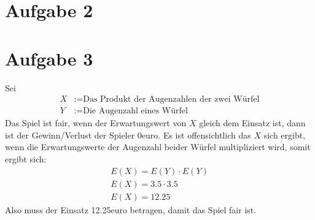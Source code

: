 \documentclass[a4paper,10pt]{article}
\begin{document}
\section*{Aufgabe 2}
\section*{Aufgabe 3}
Sei
\begin{align*}
    X &:= \text{Das Produkt der Augenzahlen der zwei Würfel} \\
    Y &:= \text{Die Augenzahl eines Würfel}
\end{align*}
Das Spiel ist fair, wenn der Erwartungswert von $X$ gleich dem Einsatz ist, dann ist der Gewinn/Verlust der Spieler 0euro. Es ist offensichtlich das $X$ sich ergibt, wenn die Erwartungswerte der Augenzahl beider Würfel multipliziert wird, somit ergibt sich:
\begin{align*}
    E(X) = E(Y) \cdot E(Y) \\
    E(X) = 3.5 \cdot 3.5 \\
    E(X) = 12.25
\end{align*}
Also muss der Einsatz 12.25euro betragen, damit das Spiel fair ist.
\end{document}
